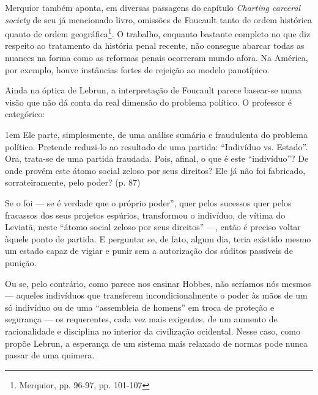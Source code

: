 \documentclass[12pt,a4paper]{article}
\newenvironment{citac}
{
	\begin{addmargin}
		[4cm]{1em} \footnotesize}{\normalfont 
	\end{addmargin}
}
\begin{document}
	Merquior também aponta, em diversas passagens do capítulo 
	\textit{Charting carceral society} de seu já mencionado livro, 
	omissões de Foucault tanto de ordem histórica quanto de ordem 
	geográfica\footnote{Merquior, pp. 96-97, pp. 101-107}. O trabalho, 
	enquanto bastante completo no que diz respeito ao tratamento da 
	história penal recente, não consegue abarcar todas as nuances na 
	forma como as reformas penais ocorreram mundo afora. Na América, 
	por exemplo, houve instâncias fortes de rejeição ao modelo 
	panotípico. 

	Ainda na óptica de Lebrun, a interpretação de Foucault parece basear-se 
	numa visão que não dá conta da real dimensão do problema político. 
	O professor é categórico: 

	\begin{citac}
		Ele parte, simplesmente, de uma análise sumária e fraudulenta 
		do problema político. Pretende reduzi-lo ao resultado de uma 
		partida: “Indivíduo vs. Estado”. Ora, trata-se de uma partida 
		fraudada. Pois, afinal, o que é este “indivíduo”? De onde 
		provém este átomo social zeloso por seus direitos? Ele já não 
		foi fabricado, sorrateiramente, pelo poder? 
		\cite{lebrun} (p. 87)
	\end{citac}

	Se o foi — se é verdade que o próprio poder”, quer pelos sucessos quer 
	pelos fracassos dos seus projetos espúrios, transformou o indivíduo, de 
	vítima do Leviatã, neste “átomo social zeloso por seus direitos” —, então 
	é preciso voltar àquele ponto de partida. E perguntar se, de fato, algum 
	dia, teria existido mesmo um estado capaz de vigiar e punir sem a 
	autorização dos súditos passíveis de punição. 
	
    Ou se, pelo contrário, como parece nos ensinar Hobbes, não seríamos nós 
    mesmos — aqueles indivíduos que transferem incondicionalmente o poder às 
    mãos de um só indivíduo ou de uma “assembleia de homens” em troca de 
    proteção e segurança — os requerentes, cada vez mais exigentes, de um 
    aumento de racionalidade e disciplina no interior da civilização ocidental. 
    Nesse caso, como propõe Lebrun, a esperança de um sistema mais relaxado de
    normas pode nunca passar de uma quimera. 

	
	
	
\end{document}
